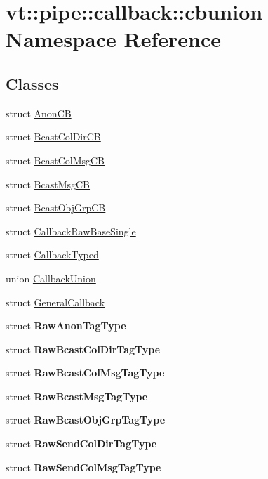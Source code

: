 \hypertarget{namespacevt_1_1pipe_1_1callback_1_1cbunion}{}\section{vt\+:\+:pipe\+:\+:callback\+:\+:cbunion Namespace Reference}
\label{namespacevt_1_1pipe_1_1callback_1_1cbunion}
\subsection*{Classes}
\begin{DoxyCompactItemize}
\item 
struct \hyperlink{structvt_1_1pipe_1_1callback_1_1cbunion_1_1_anon_c_b}{Anon\+CB}
\item 
struct \hyperlink{structvt_1_1pipe_1_1callback_1_1cbunion_1_1_bcast_col_dir_c_b}{Bcast\+Col\+Dir\+CB}
\item 
struct \hyperlink{structvt_1_1pipe_1_1callback_1_1cbunion_1_1_bcast_col_msg_c_b}{Bcast\+Col\+Msg\+CB}
\item 
struct \hyperlink{structvt_1_1pipe_1_1callback_1_1cbunion_1_1_bcast_msg_c_b}{Bcast\+Msg\+CB}
\item 
struct \hyperlink{structvt_1_1pipe_1_1callback_1_1cbunion_1_1_bcast_obj_grp_c_b}{Bcast\+Obj\+Grp\+CB}
\item 
struct \hyperlink{structvt_1_1pipe_1_1callback_1_1cbunion_1_1_callback_raw_base_single}{Callback\+Raw\+Base\+Single}
\item 
struct \hyperlink{structvt_1_1pipe_1_1callback_1_1cbunion_1_1_callback_typed}{Callback\+Typed}
\item 
union \hyperlink{unionvt_1_1pipe_1_1callback_1_1cbunion_1_1_callback_union}{Callback\+Union}
\item 
struct \hyperlink{structvt_1_1pipe_1_1callback_1_1cbunion_1_1_general_callback}{General\+Callback}
\item 
struct {\bfseries Raw\+Anon\+Tag\+Type}
\item 
struct {\bfseries Raw\+Bcast\+Col\+Dir\+Tag\+Type}
\item 
struct {\bfseries Raw\+Bcast\+Col\+Msg\+Tag\+Type}
\item 
struct {\bfseries Raw\+Bcast\+Msg\+Tag\+Type}
\item 
struct {\bfseries Raw\+Bcast\+Obj\+Grp\+Tag\+Type}
\item 
struct {\bfseries Raw\+Send\+Col\+Dir\+Tag\+Type}
\item 
struct {\bfseries Raw\+Send\+Col\+Msg\+Tag\+Type}

\end{DoxyCompactItemize}
